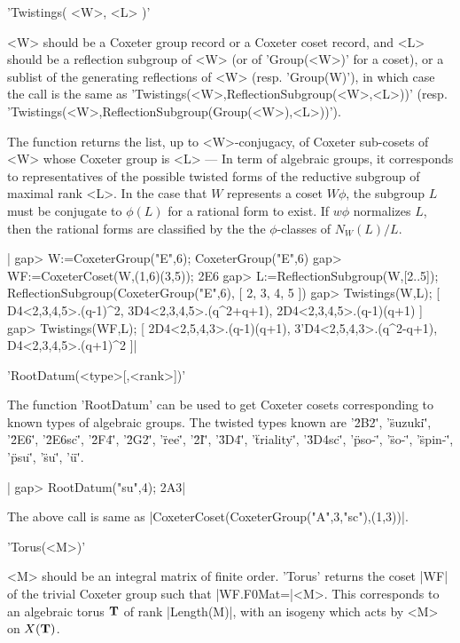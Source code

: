 'Twistings( <W>, <L> )'

<W>  should be a  Coxeter group record  or a Coxeter  coset record, and <L>
should be a reflection subgroup of <W> (or of 'Group(<W>)' for a coset), or
a sublist of the generating reflections of <W> (resp. 'Group(W)'), in which
case  the call is  the same as 'Twistings(<W>,ReflectionSubgroup(<W>,<L>))'
(resp.  'Twistings(<W>,ReflectionSubgroup(Group(<W>),<L>))').  

The  function returns the list, up  to <W>-conjugacy, of Coxeter sub-cosets
of  <W> whose  Coxeter group  is <L>  --- In  term of  algebraic groups, it
corresponds  to  representatives  of  the  possible  twisted  forms  of the
reductive  subgroup of maximal rank <L>. In  the case that $W$ represents a
coset  $W\phi$,  the  subgroup  $L$  must  be  conjugate to $\phi(L)$ for a
rational  form to exist. If $w\phi$ normalizes $L$, then the rational forms
are classified by the the $\phi$-classes of $N_W(L)/L$.

|    gap> W:=CoxeterGroup("E",6);
    CoxeterGroup("E",6)
    gap> WF:=CoxeterCoset(W,(1,6)(3,5));
    2E6
    gap> L:=ReflectionSubgroup(W,[2..5]);
    ReflectionSubgroup(CoxeterGroup("E",6), [ 2, 3, 4, 5 ])
    gap> Twistings(W,L);
    [ D4<2,3,4,5>.(q-1)^2, 3D4<2,3,4,5>.(q^2+q+1), 
      2D4<2,3,4,5>.(q-1)(q+1) ]
    gap> Twistings(WF,L);
    [ 2D4<2,5,4,3>.(q-1)(q+1), 3'D4<2,5,4,3>.(q^2-q+1), 
      D4<2,3,4,5>.(q+1)^2 ]|


'RootDatum(<type>[,<rank>])'

The function 'RootDatum' can be used to get Coxeter cosets corresponding to
known  types of  algebraic groups.  The twisted  types known are '\"2B2\"',
'\"suzuki\"',  '\"2E6\"',  '\"2E6sc\"',  '\"2F4\"',  '\"2G2\"',  '\"ree\"',
'\"2I\"',  '\"3D4\"',  '\"triality\"',  '\"3D4sc\"', '\"pso-\"', '\"so-\"',
'\"spin-\"', '\"psu\"', '\"su\"', '\"u\"'.

|    gap> RootDatum("su",4);
    2A3|

The above call is same as |CoxeterCoset(CoxeterGroup("A",3,"sc"),(1,3))|.


'Torus(<M>)'

<M> should be an integral matrix of finite order. 'Torus' returns the coset
|WF|   of  the  trivial  Coxeter   group  such  that  |WF.F0Mat=|<M>.  This
corresponds  to  an  algebraic  torus  ${\bf T}$  of  rank |Length(M)|, with an
isogeny which acts by <M> on $X({\bf T})$.

